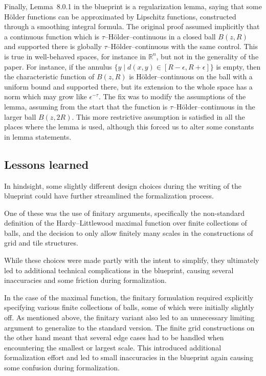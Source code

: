 \documentclass[12pt]{amsart}
\newcommand*{\real}{\mathbb{R}} %
\theoremstyle{definition}
\theoremstyle{plain}
\begin{document}
Finally, Lemma~8.0.1 in the blueprint is a regularization lemma, saying that
some Hölder functions can be approximated by Lipschitz functions,
constructed through a smoothing integral formula. The original proof
assumed implicitly that a continuous function which is
$\tau$--Hölder--continuous in a closed ball $B(z,R)$ and supported
there is globally $\tau$--Hölder--continuous with the same control.
This is true in well-behaved spaces, for instance in $\real^n$, but not
in the generality of the paper. For instance, if the annulus $\{y \mid
d(x,y) \in [R-\epsilon, R+\epsilon]\}$ is empty, then the
characteristic function of $B(z, R)$ is Hölder--continuous on the ball
with a uniform bound and supported there, but its extension to the
whole space has a norm which may grow like $\epsilon^{-\tau}$. The fix
was to modify the assumptions of the lemma, assuming from the start
that the function is $\tau$--Hölder--continuous in the larger ball
$B(z, 2R)$. This more restrictive assumption is satisfied in all the
places where the lemma is used, although this forced us to alter
some constants in lemma statements.

\subsection{Lessons learned}\label{subsec:blueprint_lessons}
In hindsight, some slightly different design choices during
the writing of the blueprint could have further streamlined the formalization process.

One of these was the use of finitary arguments, specifically the non-standard
definition of the Hardy--Littlewood maximal function over finite collections of balls,
and the decision to only allow finitely many scales in the constructions of grid
and tile structures.

While these choices were made partly with the intent to simplify, they ultimately
led to additional technical complications in the blueprint, causing several inaccuracies
and some friction during formalization.

In the case of the maximal function, the finitary formulation required explicitly specifying
various finite collections of balls, some of which were initially slightly off. As mentioned
above, the finitary variant also led to an unnecessary limiting argument to generalize
to the standard version.
The finite grid constructions on the other hand meant that several edge cases had to be handled
when encountering the smallest or largest scale. This introduced additional formalization effort
and led to small inaccuracies in the blueprint again causing some confusion during formalization.
\end{document}

